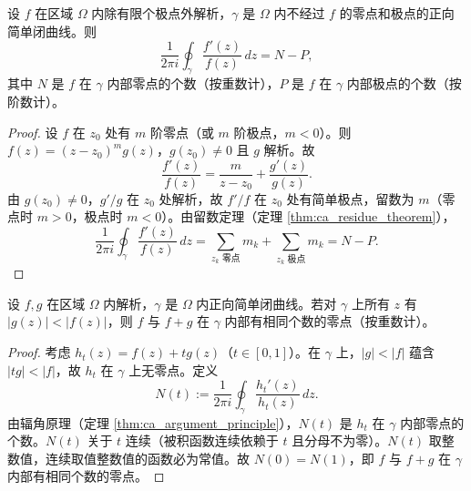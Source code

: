 \begin{theorem}[辐角原理]\label{thm:ca_argument_principle}
设 $f$ 在区域 $\Omega$ 内除有限个极点外解析，$\gamma$ 是 $\Omega$ 内不经过 $f$ 的零点和极点的正向简单闭曲线。则
\[
\frac{1}{2\pi i} \oint_\gamma \frac{f'(z)}{f(z)} \, dz = N - P,
\]
其中 $N$ 是 $f$ 在 $\gamma$ 内部零点的个数（按重数计），$P$ 是 $f$ 在 $\gamma$ 内部极点的个数（按阶数计）。
\end{theorem}

\begin{proof}
设 $f$ 在 $z_0$ 处有 $m$ 阶零点（或 $m$ 阶极点，$m < 0$）。则 $f(z) = (z - z_0)^m g(z)$，$g(z_0) \neq 0$ 且 $g$ 解析。故
\[
\frac{f'(z)}{f(z)} = \frac{m}{z - z_0} + \frac{g'(z)}{g(z)}.
\]
由 $g(z_0) \neq 0$，$g'/g$ 在 $z_0$ 处解析，故 $f'/f$ 在 $z_0$ 处有简单极点，留数为 $m$（零点时 $m > 0$，极点时 $m < 0$）。由留数定理（定理 \ref{thm:ca_residue_theorem}），
\[
\frac{1}{2\pi i} \oint_\gamma \frac{f'(z)}{f(z)} \, dz = \sum_{z_k \text{ 零点}} m_k + \sum_{z_k \text{ 极点}} m_k = N - P.
\]
\end{proof}

\begin{corollary}[Rouché 定理]\label{cor:ca_rouche}
设 $f, g$ 在区域 $\Omega$ 内解析，$\gamma$ 是 $\Omega$ 内正向简单闭曲线。若对 $\gamma$ 上所有 $z$ 有 $|g(z)| < |f(z)|$，则 $f$ 与 $f + g$ 在 $\gamma$ 内部有相同个数的零点（按重数计）。
\end{corollary}

\begin{proof}
考虑 $h_t(z) = f(z) + t g(z)$（$t \in [0, 1]$）。在 $\gamma$ 上，$|g| < |f|$ 蕴含 $|t g| < |f|$，故 $h_t$ 在 $\gamma$ 上无零点。定义
\[
N(t) := \frac{1}{2\pi i} \oint_\gamma \frac{h_t'(z)}{h_t(z)} \, dz.
\]
由辐角原理（定理 \ref{thm:ca_argument_principle}），$N(t)$ 是 $h_t$ 在 $\gamma$ 内部零点的个数。$N(t)$ 关于 $t$ 连续（被积函数连续依赖于 $t$ 且分母不为零）。$N(t)$ 取整数值，连续取值整数值的函数必为常值。故 $N(0) = N(1)$，即 $f$ 与 $f + g$ 在 $\gamma$ 内部有相同个数的零点。
\end{proof}

